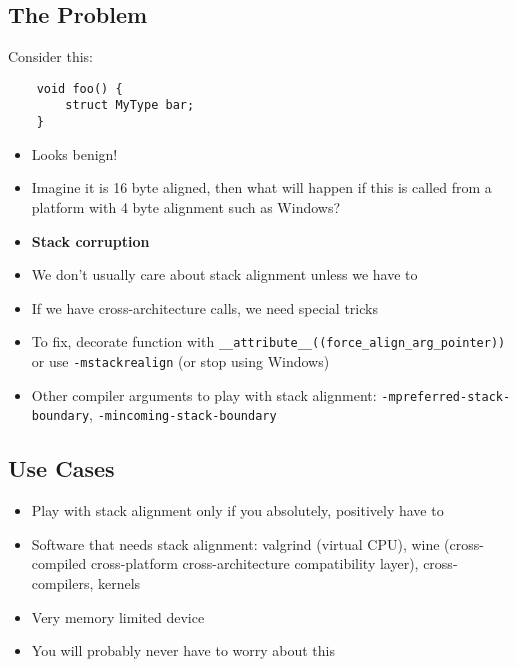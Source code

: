 \documentclass{beamer}
\begin{document}
\subsection{The Problem}
\begin{frame}[fragile]{\insertsection}{\insertsubsection}
    Consider this:
    \begin{verbatim}
    void foo() {
        struct MyType bar;
    }
    \end{verbatim}
    \begin{itemize}
        \item Looks benign!\pause
        \item Imagine it is 16 byte aligned, then what will happen if this is called from a
            platform with 4 byte alignment such as Windows?\pause
        \item \textbf{Stack corruption}
    \end{itemize}
\end{frame}

\begin{frame}[fragile]{\insertsection}{\insertsubsection}
    \begin{itemize}
        \item We don't usually care about stack alignment unless we have to\pause
        \item If we have cross-architecture calls, we need special tricks\pause
        \item To fix, decorate function with \verb|__attribute__((force_align_arg_pointer))| or use
            \verb|-mstackrealign| \pause (or stop using Windows)
        \item Other compiler arguments to play with stack alignment:
            \verb|-mpreferred-stack-boundary|, \verb|-mincoming-stack-boundary|
    \end{itemize}
\end{frame}

\subsection{Use Cases}
\begin{frame}[fragile]{\insertsection}{\insertsubsection}
    \begin{itemize}
        \item Play with stack alignment only if you absolutely, positively have to\pause
        \item Software that needs stack alignment: valgrind (virtual CPU), wine (cross-compiled
            cross-platform cross-architecture compatibility layer), cross-compilers, kernels\pause
        \item Very memory limited device\pause
        \item You will probably never have to worry about this
    \end{itemize}
\end{frame}
\end{document}
